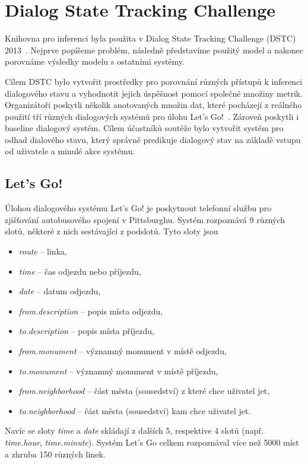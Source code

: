 \section{Dialog State Tracking Challenge}
\label{sec:dstc}

Knihovna pro inferenci byla použita v Dialog State Tracking Challenge (DSTC) 2013~\cite{dstc2013}.
Nejprve popíšeme problém, následně představíme použitý model a nakonec porovnáme výsledky modelu s ostatními systémy.

Cílem DSTC bylo vytvořit prostředky pro porovnání různých přístupů k inferenci dialogového stavu a vyhodnotit jejich úspěšnost pomocí společné množiny metrik.
Organizátoři poskytli několik anotovaných množin dat, které pocházejí z reálného použití tří různých dialogových systémů pro úlohu Let's Go!~\cite{raux2005let}.
Zároveň poskytli i baseline dialogový systém.
Cílem účastníků soutěže bylo vytvořit systém pro odhad dialového stavu, který správně predikuje dialogový stav na základě vstupu od uživatele a minulé akce systému.

\subsection{Let's Go!}

Úlohou dialogového systému Let's Go! je poskytnout telefonní službu pro zjišťování autobusového spojení v Pittsburghu.
Systém rozpoznává 9 různých slotů, některé z nich sestávající z podslotů.
Tyto sloty jsou
\begin{itemize}
\item \emph{route} -- linka,
\item \emph{time} -- čas odjezdu nebo příjezdu,
\item \emph{date} -- datum odjezdu,
\item \emph{from.description} -- popis místa odjezdu,
\item \emph{to.description} -- popis místa příjezdu,
\item \emph{from.monument} -- významný monument v místě odjezdu,
\item \emph{to.monument} -- významný monument v místě příjezdu,
\item \emph{from.neighborhood} -- část města (sousedství) z které chce uživatel jet,
\item \emph{to.neighborhood} -- část města (sousedství) kam chce uživatel jet.
\end{itemize}
Navíc se sloty \emph{time} a \emph{date} skládají z dalších 5, respektive 4 slotů (např. \emph{time.hour}, \emph{time.minute}).
Systém Let's Go celkem rozpoznával více než 5000 míst a zhruba 150 různých linek.

